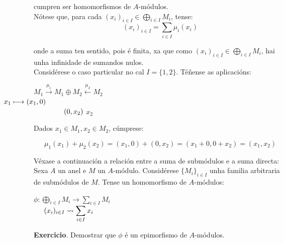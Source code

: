 \documentclass[twoside]{report}
\theoremstyle{mystyle}
\begin{document}
\noindent cumpren ser homomorfismos de $A$-módulos.\\

\noindent Nótese que, para cada $(x_{i})_{i \in I} \in \displaystyle \bigoplus_{i \in I} M_{i}$, tense:
$$(x_{i})_{i \in I} = \displaystyle \sum_{i \in I} \mu_{i}(x_{i})$$

\noindent onde a suma ten sentido, pois é finita, xa que como $(x_{i})_{i \in I} \in \displaystyle \bigoplus_{i \in I} M_{i}$, hai unha infinidade de sumandos nulos.\\

\noindent Considérese o caso particular no cal $I = \{1, 2\}$. Téñense as aplicacións:
\begin{center}
    $M_{1} \overset{\mu_{1}}{\longrightarrow} M_{1} \oplus M_{2} \overset{\mu_{2}}{\longleftarrow} M_{2}$\\
    \vspace{2mm}
    $\hspace{-15mm} x_{1} \longmapsto (x_{1}, 0)$\\
    \vspace{2mm}
    $\hspace{15mm}(0, x_{2})$  $x_{2}$
\end{center}

\vspace{3mm}

\noindent Dados $x_{1} \in M_{1}, x_{2} \in M_{2}$, cúmprese:

$$\mu_{1}(x_{1}) + \mu_{2}(x_{2}) = (x_{1}, 0) + (0, x_{2}) = (x_{1} + 0, 0 + x_{2}) = (x_{1}, x_{2})$$

\noindent Véxase a continuación a relación entre a suma de submódulos e a suma directa:\\

\noindent Sexa $A$ un anel e $M$ un $A$-módulo. Considérese $\{M_{i}\}_{i \in I}$ unha familia arbitraria de submódulos de $M$. Tense un homomorfismo de $A$-módulos:
\begin{center}
    $\phi: \displaystyle \bigoplus_{i \in I} M_{i} \longrightarrow \displaystyle \sum_{i \in I} M_{i}$\\
    \vspace{2mm}
    $\hspace{5mm} (x_{i})_{i \in I} \leadsto \displaystyle \sum_{i \in I} x_{i}$
\end{center}

\noindent \textbf{Exercicio}. Demostrar que $\phi$ é un epimorfismo de $A$-módulos.\\
\end{document}
